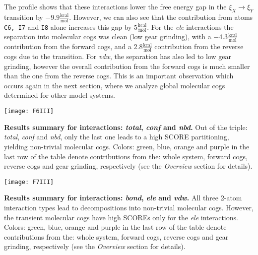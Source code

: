 \documentclass[a4paper,11pt,twoside]{book}%
\begin{document}
The profile shows that these interactions lower the free energy gap in the $\xi_X\to\xi_Y$ transition by $-9.9\frac{\text{kcal}}{\text{mol}}$.
However, we can {\color{black}also} see that {\color{black}the contribution from} atoms \texttt{C6, I7} and \texttt{I8} alone increases this gap by $5\frac{\text{kcal}}{\text{mol}}$.
{\color{black}For the \emph{ele} interactions} the separation into molecular cogs was clean (low gear grinding), with a $-4.3\frac{\text{kcal}}{\text{mol}}$ contribution from the forward cogs, and a $2.8\frac{\text{kcal}}{\text{mol}}$ contribution from the reverse cogs due to the transition.
{\color{black}For \emph{vdw}, the separation has also led to low gear grinding, however the overall contribution from the forward cogs is much smaller than the one from the reverse cogs.
This is an important observation which occurs again in the next section, where we analyze global molecular cogs determined for other model systems.
}

\begin{table}[H]
\centering
\texttt{[image: F6III]}
\caption{{\bf Results summary for interactions: \emph{total}, \emph{conf} and \emph{nbd}.} 
Out of the triple: \emph{total}, \emph{conf} and \emph{nbd}, only the last one leads to a high SCORE partitioning, yielding non-trivial molecular cogs.
{\color{black}Colors: green, blue, orange and purple in the last row of the table denote contributions from the: whole system, forward cogs, reverse cogs and gear grinding, respectively (see the \emph{Overview} section for details).}
}
\label{tab:resultsI}
\end{table}

{
\centering
 \begin{table}[H]
\centering
\texttt{[image: F7III]}
\caption{{\bf Results summary for interactions: \emph{bond}, \emph{ele} and \emph{vdw}.} 
All three 2-atom interaction types lead to decompositions into non-trivial molecular cogs.
{\color{black}However, the transient molecular cogs have high SCOREs only for the \emph{ele} interactions.
Colors: green, blue, orange and purple in the last row of the table denote contributions from the: whole system, forward cogs, reverse cogs and gear grinding, respectively (see the \emph{Overview} section for details).}
}
\label{tab:resultsII}
\end{table}
}
\end{document}

